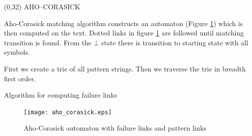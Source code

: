 \documentclass[a4paper]{article} %
\begin{document}
\begin{textblock}{60}(0,32)
  {\sffamily\normalsize{\color{sciorange}AHO--CORASICK
      }}\vspace{1mm}\\ %
\footnotesize 

Aho-Corasick matching algorithm constructs an automaton (Figure \ref{fig:ac_machine}) which is then computed on the text.
Dotted links in figure \ref{fig:ac_machine} are followed until matching transition is found. From the $\bot$ state there is transition
to starting state with all symbols.


First we create a trie of all pattern strings. Then we traverse the trie in breadth first order.



\vspace{5mm}

\begin{algorithm} 
\label{ac_fail}
\caption{Algorithm for computing failure links}

\begin{algorithmic}[1]
\end{algorithmic}
\end{algorithm}


%

\begin{figure}
\label{fig:ac_machine}
\centering
 \texttt{[image: aho\_corasick.eps]}
\caption{Aho-Corasick automaton with failure links and pattern links}
\end{figure}


%


\end{textblock} 
\end{document}
